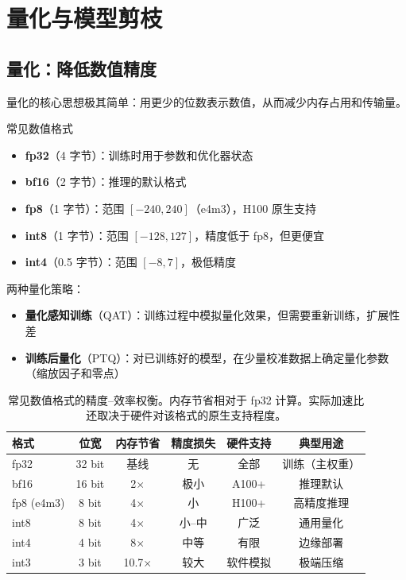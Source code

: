 \documentclass[a4paper]{article}
\begin{document}

\section{量化与模型剪枝}

\subsection{量化：降低数值精度}

量化的核心思想极其简单：用更少的位数表示数值，从而减少内存占用和传输量。

\begin{importantbox}{常见数值格式}
\begin{itemize}
    \item \textbf{fp32}（4 字节）：训练时用于参数和优化器状态
    \item \textbf{bf16}（2 字节）：推理的默认格式
    \item \textbf{fp8}（1 字节）：范围 $[-240, 240]$（e4m3），H100 原生支持
    \item \textbf{int8}（1 字节）：范围 $[-128, 127]$，精度低于 fp8，但更便宜
    \item \textbf{int4}（0.5 字节）：范围 $[-8, 7]$，极低精度
\end{itemize}
\end{importantbox}

两种量化策略：

\begin{itemize}
    \item \textbf{量化感知训练}（QAT）：训练过程中模拟量化效果，但需要重新训练，扩展性差
    \item \textbf{训练后量化}（PTQ）：对已训练好的模型，在少量校准数据上确定量化参数（缩放因子和零点）
\end{itemize}

\begin{table}[H]
\centering
\begin{tabular}{lccccc}
\toprule
\textbf{格式} & \textbf{位宽} & \textbf{内存节省} & \textbf{精度损失} & \textbf{硬件支持} & \textbf{典型用途} \\
\midrule
fp32 & 32 bit & 基线 & 无 & 全部 & 训练（主权重） \\
bf16 & 16 bit & 2$\times$ & 极小 & A100+ & 推理默认 \\
fp8 (e4m3) & 8 bit & 4$\times$ & 小 & H100+ & 高精度推理 \\
int8 & 8 bit & 4$\times$ & 小--中 & 广泛 & 通用量化 \\
int4 & 4 bit & 8$\times$ & 中等 & 有限 & 边缘部署 \\
int3 & 3 bit & 10.7$\times$ & 较大 & 软件模拟 & 极端压缩 \\
\bottomrule
\end{tabular}
\caption{常见数值格式的精度--效率权衡。内存节省相对于 fp32 计算。实际加速比还取决于硬件对该格式的原生支持程度。}
\end{table}
\end{document}
